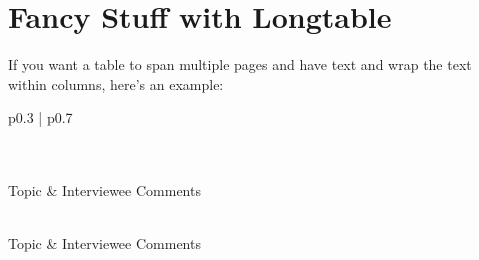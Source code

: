 \section{Fancy Stuff with Longtable}\label{sec:longtable-with-text-wrapping}

If you want a table to span multiple pages and have text and wrap the text within columns, here's an example:

\begin{singlespace} %

\begin{center}
\begin{longtable}[c]{p{0.3\linewidth} | p{0.7\linewidth}}
\caption{Sample Interview Records from Field Visits: test}
\label{tab:interviews_test}\\


\hline
{}\\
\hline
Topic                                                                        & Interviewee Comments                                                                                                                                                                                                                                                                                                                                               \\ \hline
\endfirsthead 

\hline
{}\\
\hline
Topic                                                                        & Interviewee Comments                                                                                                                                                                                                                                                                                                                                               \\ \hline
\endhead 


\hline
\endfoot

\hline
{}\\
\hline\hline
\endlastfoot



\end{longtable}
\end{center}
\end{singlespace}
